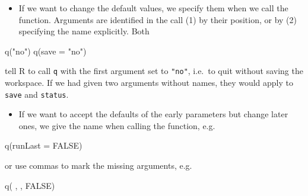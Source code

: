 \documentclass[
  9pt,
  a4paper,
  ignorenonframetext,
  notheorems]{beamer}
\newenvironment{Shaded}{\begin{snugshade}}{\end{snugshade}}
\newcommand{\AttributeTok}[1]{\textcolor[rgb]{0.40,0.45,0.13}{#1}}
\newcommand{\ConstantTok}[1]{\textcolor[rgb]{0.56,0.35,0.01}{#1}}
\newcommand{\FunctionTok}[1]{\textcolor[rgb]{0.28,0.35,0.67}{#1}}
\newcommand{\NormalTok}[1]{\textcolor[rgb]{0.00,0.23,0.31}{#1}}
\newcommand{\StringTok}[1]{\textcolor[rgb]{0.13,0.47,0.30}{#1}}
\providecommand{\tightlist}{%
  \setlength{\itemsep}{0pt}\setlength{\parskip}{0pt}}\usepackage{longtable,booktabs,array}
\begin{document}
\begin{frame}[fragile]
\begin{itemize}
\tightlist
\item
  If we want to change the default values, we specify them when we call
  the function. Arguments are identified in the call (1) by their
  position, or by (2) specifying the name explicitly. Both
\end{itemize}

\begin{Shaded}
\begin{Highlighting}[]
\FunctionTok{q}\NormalTok{(}\StringTok{"no"}\NormalTok{) }
\FunctionTok{q}\NormalTok{(}\AttributeTok{save =} \StringTok{"no"}\NormalTok{)}
\end{Highlighting}
\end{Shaded}

tell R to call \texttt{q} with the first argument set to \texttt{"no"},
i.e.~to quit without saving the workspace. If we had given two arguments
without names, they would apply to \texttt{save} and \texttt{status}.

\begin{itemize}
\tightlist
\item
  If we want to accept the defaults of the early parameters but change
  later ones, we give the name when calling the function, e.g.
\end{itemize}

\begin{Shaded}
\begin{Highlighting}[]
\FunctionTok{q}\NormalTok{(}\AttributeTok{runLast =} \ConstantTok{FALSE}\NormalTok{)}
\end{Highlighting}
\end{Shaded}

or use commas to mark the missing arguments, e.g.

\begin{Shaded}
\begin{Highlighting}[]
\FunctionTok{q}\NormalTok{( , , }\ConstantTok{FALSE}\NormalTok{)}
\end{Highlighting}
\end{Shaded}
\end{frame}
\end{document}
